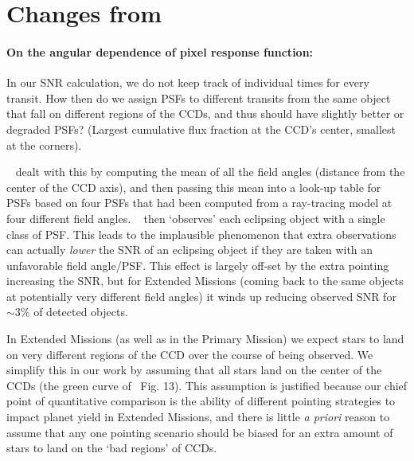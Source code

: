 \section{Changes from~\citet{Sullivan_2015}}
\label{sec:changes_from_S15}
\paragraph{On the angular dependence of \tesss pixel response function:} 
In our SNR calculation, we do not keep track of individual times for every transit. 
How then do we assign PSFs to different transits from the same object that fall on different regions of the CCDs, and thus should have slightly better or degraded PSFs? (Largest cumulative flux fraction at the CCD's center, smallest at the corners). 

~ dealt with this by computing the mean of all the field angles (distance from the center of the CCD axis), and then passing this mean into a look-up table for PSFs based on four PSFs that had been computed from a ray-tracing model at four different field angles.
~ then `observes' each eclipsing object with a single class of PSF.
This leads to the implausible phenomenon that extra observations can actually \textit{lower} the SNR of an eclipsing object if they are taken with an unfavorable field angle/PSF. 
This effect is largely off-set by the extra pointing increasing the SNR, but for Extended Missions (coming back to the same objects at potentially very different field angles) it winds up reducing observed SNR for $\sim$3\% of detected objects.

In Extended Missions (as well as in the Primary Mission) we expect stars to land on very different regions of the CCD over the course of being observed.
We simplify this in our work by assuming that all stars land on the center of the \tess CCDs (the green curve of~ Fig. 13). 
This assumption is justified because our chief point of quantitative comparison is the ability of different pointing strategies to impact \tesss planet yield in Extended Missions, and there is little \textit{a priori} reason to assume that any one pointing scenario should be biased for an extra amount of stars to land on the `bad regions' of \tesss CCDs.
	
